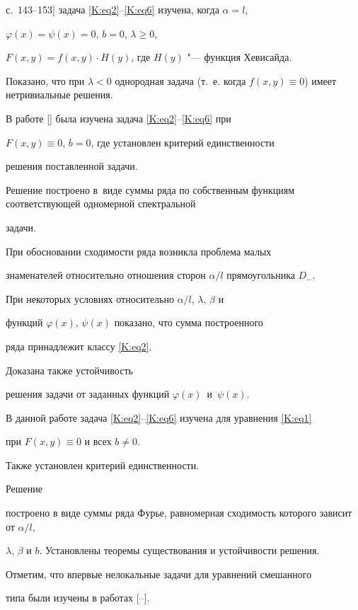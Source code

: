 с.~143--153] задача \eqref{K:eq2}--\eqref{K:eq6} изучена, когда $\alpha=l$,

$\varphi(x)=\psi(x)=0$, $b=0$, $\lambda\geq0$,

$F(x,y)=f(x,y)\cdot H(y)$, где $H(y)$ "--- функция Хевисайда. 

Показано, что при $\lambda<0$ однородная задача (т.~е. когда $f(x,y)\equiv0$) имеет нетривиальные решения.



В работе [] была изучена задача \eqref{K:eq2}--\eqref{K:eq6} при

$F(x,y)\equiv0$, $b=0$, где установлен критерий единственности

решения поставленной задачи. 

Решение построено в~виде суммы ряда по собственным функциям соответствующей одномерной спектральной

задачи. 

При обосновании сходимости ряда возникла проблема малых

знаменателей относительно отношения сторон $\alpha/l$ пря\-мо\-уголь\-ни\-ка $D_-$.

При некоторых условиях относительно $\alpha/ l$, $\lambda$, $\beta$ и

функций $\varphi (x)$, $\psi(x)$ показано, что сумма построенного

ряда принадлежит классу \eqref{K:eq2}. 

Доказана также устойчивость

решения задачи от заданных функций $\varphi (x)$~и~$\psi(x)$.



В данной работе задача \eqref{K:eq2}--\eqref{K:eq6} изучена для уравнения \eqref{K:eq1}

при $F(x,y)\equiv0$ и всех $b\neq0$. 

Также установлен критерий единственности. 

Решение

построено в виде суммы ряда Фурье, равномерная сходимость которого зависит от $\alpha/l$,

$\lambda$, $\beta$ и $b$. Установлены теоремы существования и устойчивости решения.



Отметим, что впервые нелокальные задачи для уравнений сме\-ша\-нно\-го

типа были изучены в работах [--].



